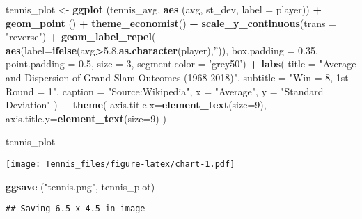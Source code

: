\documentclass[]{article}
\newenvironment{Shaded}{\begin{snugshade}}{\end{snugshade}}
\newcommand{\KeywordTok}[1]{\textcolor[rgb]{0.13,0.29,0.53}{\textbf{#1}}}
\newcommand{\DataTypeTok}[1]{\textcolor[rgb]{0.13,0.29,0.53}{#1}}
\newcommand{\DecValTok}[1]{\textcolor[rgb]{0.00,0.00,0.81}{#1}}
\newcommand{\FloatTok}[1]{\textcolor[rgb]{0.00,0.00,0.81}{#1}}
\newcommand{\StringTok}[1]{\textcolor[rgb]{0.31,0.60,0.02}{#1}}
\newcommand{\OperatorTok}[1]{\textcolor[rgb]{0.81,0.36,0.00}{\textbf{#1}}}
\newcommand{\NormalTok}[1]{#1}
\begin{document}
\begin{Shaded}
\begin{Highlighting}[]
\NormalTok{tennis_plot <-}\StringTok{ }\KeywordTok{ggplot}\NormalTok{ (tennis_avg, }\KeywordTok{aes}\NormalTok{ (avg, st_dev, }\DataTypeTok{label =}\NormalTok{ player)) }\OperatorTok{+}
\StringTok{   }\KeywordTok{geom_point}\NormalTok{ () }\OperatorTok{+}
\StringTok{   }\KeywordTok{theme_economist}\NormalTok{() }\OperatorTok{+}
\StringTok{   }\KeywordTok{scale_y_continuous}\NormalTok{(}\DataTypeTok{trans =} \StringTok{"reverse"}\NormalTok{) }\OperatorTok{+}
\StringTok{   }\KeywordTok{geom_label_repel}\NormalTok{(}
      \KeywordTok{aes}\NormalTok{(}\DataTypeTok{label=}\KeywordTok{ifelse}\NormalTok{(avg}\OperatorTok{>}\FloatTok{5.8}\NormalTok{,}\KeywordTok{as.character}\NormalTok{(player),}\StringTok{''}\NormalTok{)),}
      \DataTypeTok{box.padding   =} \FloatTok{0.35}\NormalTok{, }
      \DataTypeTok{point.padding =} \FloatTok{0.5}\NormalTok{,}
      \DataTypeTok{size =} \DecValTok{3}\NormalTok{,}
      \DataTypeTok{segment.color =} \StringTok{'grey50'}\NormalTok{) }\OperatorTok{+}
\StringTok{   }\KeywordTok{labs}\NormalTok{(}
      \DataTypeTok{title =} \StringTok{"Average and Dispersion of Grand Slam Outcomes (1968-2018)"}\NormalTok{,}
      \DataTypeTok{subtitle =} \StringTok{"Win = 8, 1st Round = 1"}\NormalTok{,}
      \DataTypeTok{caption =} \StringTok{"Source:Wikipedia"}\NormalTok{,}
      \DataTypeTok{x =} \StringTok{"Average"}\NormalTok{,}
      \DataTypeTok{y =} \StringTok{"Standard Deviation"}
\NormalTok{      ) }\OperatorTok{+}
\StringTok{   }\KeywordTok{theme}\NormalTok{(}
      \DataTypeTok{axis.title.x=}\KeywordTok{element_text}\NormalTok{(}\DataTypeTok{size=}\DecValTok{9}\NormalTok{),}
      \DataTypeTok{axis.title.y=}\KeywordTok{element_text}\NormalTok{(}\DataTypeTok{size=}\DecValTok{9}\NormalTok{)}
\NormalTok{   )}

\NormalTok{tennis_plot}
\end{Highlighting}
\end{Shaded}

\texttt{[image: Tennis\_files/figure-latex/chart-1.pdf]}

\begin{Shaded}
\begin{Highlighting}[]
\KeywordTok{ggsave}\NormalTok{ (}\StringTok{"tennis.png"}\NormalTok{, tennis_plot)}
\end{Highlighting}
\end{Shaded}

\begin{verbatim}
## Saving 6.5 x 4.5 in image
\end{verbatim}
\end{document}
